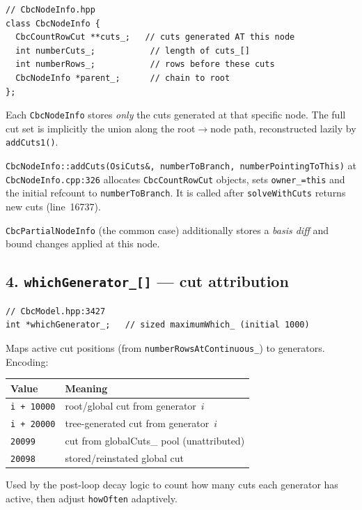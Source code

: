 \documentclass[11pt,a4paper]{article}
\begin{document}
\begin{lstlisting}
// CbcNodeInfo.hpp
class CbcNodeInfo {
  CbcCountRowCut **cuts_;   // cuts generated AT this node
  int numberCuts_;           // length of cuts_[]
  int numberRows_;           // rows before these cuts
  CbcNodeInfo *parent_;      // chain to root
};
\end{lstlisting}

Each \texttt{CbcNodeInfo} stores \emph{only} the cuts generated at
that specific node.  The full cut set is implicitly the union along
the root$\to$node path, reconstructed lazily by
\texttt{addCuts1()}.

\texttt{CbcNodeInfo::addCuts(OsiCuts\&, numberToBranch,
numberPointingToThis)} at \texttt{CbcNodeInfo.cpp:326} allocates
\texttt{CbcCountRowCut} objects, sets \texttt{owner\_=this} and
the initial refcount to \texttt{numberToBranch}.  It is called
after \texttt{solveWithCuts} returns new cuts (line~16737).

\texttt{CbcPartialNodeInfo} (the common case) additionally stores a
\emph{basis diff} and bound changes applied at this node.

\subsection*{4. \texttt{whichGenerator\_[]} --- cut attribution}

\begin{lstlisting}
// CbcModel.hpp:3427
int *whichGenerator_;   // sized maximumWhich_ (initial 1000)
\end{lstlisting}

Maps active cut positions (from
\texttt{numberRowsAtContinuous\_}) to generators.  Encoding:

\begin{tabular}{ll}
\toprule
Value & Meaning\\
\midrule
\texttt{i + 10000} & root/global cut from generator~$i$\\
\texttt{i + 20000} & tree-generated cut from generator~$i$\\
\texttt{20099} & cut from globalCuts\_ pool (unattributed)\\
\texttt{20098} & stored/reinstated global cut\\
\bottomrule
\end{tabular}

Used by the post-loop decay logic to count how many cuts each
generator has active, then adjust \texttt{howOften} adaptively.
\end{document}
